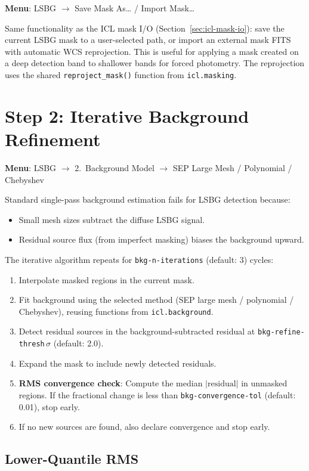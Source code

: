 \documentclass[11pt,fleqn]{book}
\begin{document}
\textbf{Menu}: LSBG $\to$ Save Mask As\ldots{} / Import Mask\ldots

Same functionality as the ICL mask I/O (Section~\ref{sec:icl-mask-io}): save the current LSBG mask to a user-selected path, or import an external mask FITS with automatic WCS reprojection.  This is useful for applying a mask created on a deep detection band to shallower bands for forced photometry.  The reprojection uses the shared \texttt{reproject\_mask()} function from \texttt{icl.masking}.


\section{Step 2: Iterative Background Refinement}
\label{sec:lsbg-bkg}

\textbf{Menu}: LSBG $\to$ 2.\ Background Model $\to$ SEP Large Mesh / Polynomial / Chebyshev

Standard single-pass background estimation fails for LSBG detection because:
\begin{itemize}[leftmargin=2em]
  \item Small mesh sizes subtract the diffuse LSBG signal.
  \item Residual source flux (from imperfect masking) biases the background upward.
\end{itemize}

The iterative algorithm repeats for \texttt{bkg-n-iterations} (default: 3) cycles:
\begin{enumerate}[leftmargin=2em]
  \item Interpolate masked regions in the current mask.
  \item Fit background using the selected method (SEP large mesh / polynomial / Chebyshev), reusing functions from \texttt{icl.background}.
  \item Detect residual sources in the background-subtracted residual at \texttt{bkg-refine-thresh}$\,\sigma$ (default: 2.0).
  \item Expand the mask to include newly detected residuals.
  \item \textbf{RMS convergence check}: Compute the median $|\mathrm{residual}|$ in unmasked regions.  If the fractional change is less than \texttt{bkg-convergence-tol} (default: 0.01), stop early.
  \item If no new sources are found, also declare convergence and stop early.
\end{enumerate}

\subsection{Lower-Quantile RMS}
\end{document}

